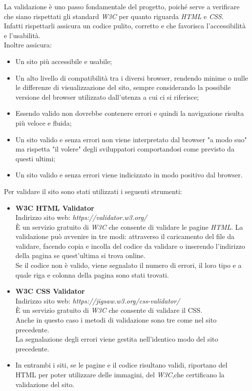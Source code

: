 La validazione è uno passo fondamentale del progetto, poiché serve a verificare che siano rispettati gli standard \emph{W3C} per quanto riguarda \emph{HTML} e \emph{CSS}.\\
Infatti rispettarli assicura un codice pulito, corretto e che favorisca l'accessibilità e l'usabilità.\\
Inoltre assicura:
\begin{itemize}
	\item Un sito più accessibile e usabile;
	\item Un alto livello di compatibilità tra i diversi browser, rendendo minime o nulle le differenze di visualizzazione del sito, sempre considerando la possibile versione del browser utilizzato dall'utenza a cui ci si riferisce;
	\item Essendo valido non dovrebbe contenere errori e quindi la navigazione risulta più veloce e fluida;
	\item Un sito valido e senza errori non viene interpretato dal browser "a modo suo" ma rispetta "il volere" degli sviluppatori comportandosi come previsto da questi ultimi; %
	\item Un sito valido e senza errori viene indicizzato in modo positivo dal browser.  %
\end{itemize}
Per validare il sito sono stati utilizzati i seguenti strumenti:
\begin{itemize}
	\item \textbf{W3C HTML Validator}\\
	Indirizzo sito web: \emph{https://validator.w3.org/}\\
	È un servizio gratuito di \emph{W3C} che consente di validare le pagine \emph{HTML}.
	La validazione può avvenire in tre modi: attraverso il caricamento del file da validare, facendo copia e incolla del codice da validare o inserendo l'indirizzo della pagina se quest'ultima si trova online.\\
Se il codice non è valido, viene segnalato il numero di errori, il loro tipo e a quale riga e colonna della pagina sono stati trovati.
	\item \textbf{W3C CSS Validator}\\
	Indirizzo sito web: \emph{https://jigsaw.w3.org/css-validator/}\\
	È un servizio gratuito di \emph{W3C} che consente di validare il CSS.\\
	Anche in questo caso i metodi di validazione sono tre come nel sito precedente.\\
	La segnalazione degli errori viene gestita nell'identico modo del sito precedente.\\
	 \item In entrambi i siti, se le pagine e il codice risultano validi, riportano del HTML per poter utilizzare delle immagini, del \emph{W3C},che certificano la validazione del sito.
\end{itemize}